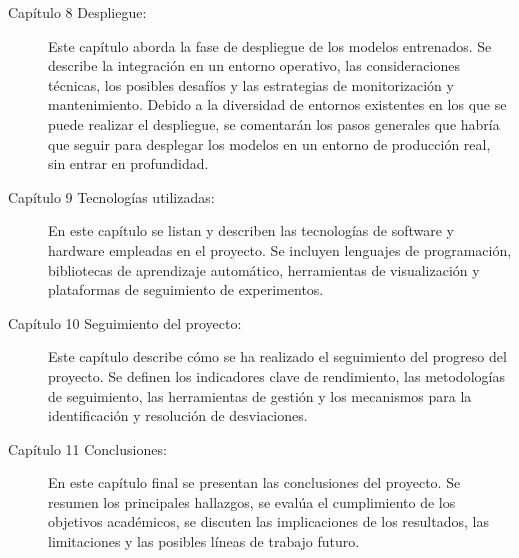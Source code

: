 \begin{description}
\item[Capítulo 8 Despliegue:] Este capítulo aborda la fase de despliegue de los modelos entrenados. Se describe la integración en un entorno operativo, las consideraciones técnicas, los posibles desafíos y las estrategias de monitorización y mantenimiento. Debido a la diversidad de entornos existentes en los que se puede realizar el despliegue, se comentarán los pasos generales que habría que seguir para desplegar los modelos en un entorno de producción real, sin entrar en profundidad.

\item[Capítulo 9 Tecnologías utilizadas:] En este capítulo se listan y describen las tecnologías de software y hardware empleadas en el proyecto. Se incluyen lenguajes de programación, bibliotecas de aprendizaje automático, herramientas de visualización y plataformas de seguimiento de experimentos.

\item[Capítulo 10 Seguimiento del proyecto:] Este capítulo describe cómo se ha realizado el seguimiento del progreso del proyecto. Se definen los indicadores clave de rendimiento, las metodologías de seguimiento, las herramientas de gestión y los mecanismos para la identificación y resolución de desviaciones.

\item[Capítulo 11 Conclusiones:] En este capítulo final se presentan las conclusiones del proyecto. Se resumen los principales hallazgos, se evalúa el cumplimiento de los objetivos académicos, se discuten las implicaciones de los resultados, las limitaciones y las posibles líneas de trabajo futuro.
\end{description}
